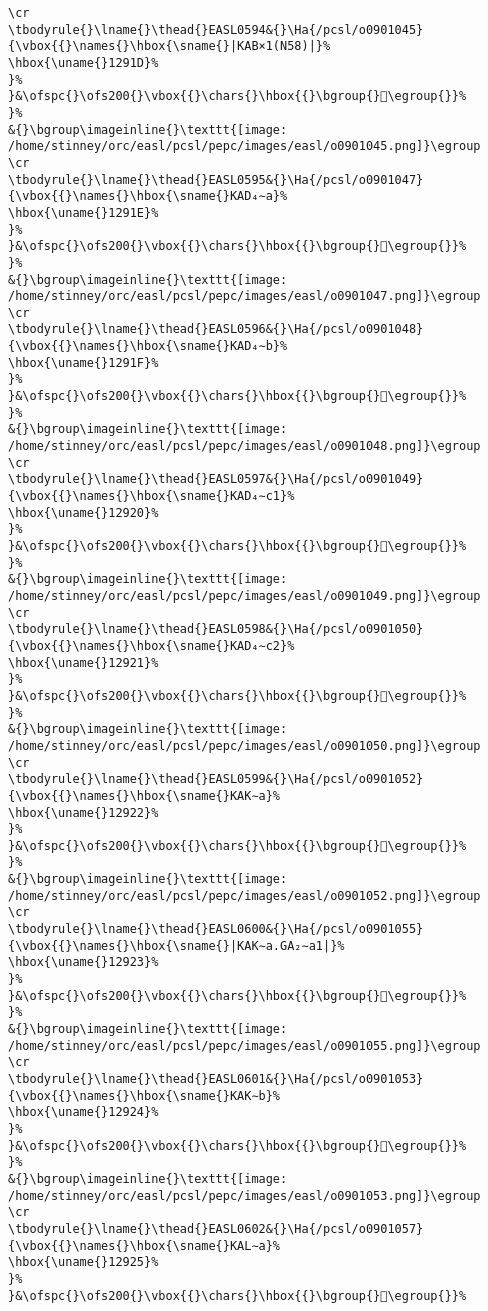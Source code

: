 \begin{verbatim}
\cr
\tbodyrule{}\lname{}\thead{}EASL0594&{}\Ha{/pcsl/o0901045}{\vbox{{}\names{}\hbox{\sname{}|KAB×1(N58)|}%
\hbox{\uname{}1291D}%
}%
}&\ofspc{}\ofs200{}\vbox{{}\chars{}\hbox{{}\bgroup{}𒤝\egroup{}}%
}%
&{}\bgroup\imageinline{}\texttt{[image: /home/stinney/orc/easl/pcsl/pepc/images/easl/o0901045.png]}\egroup
\cr
\tbodyrule{}\lname{}\thead{}EASL0595&{}\Ha{/pcsl/o0901047}{\vbox{{}\names{}\hbox{\sname{}KAD₄∼a}%
\hbox{\uname{}1291E}%
}%
}&\ofspc{}\ofs200{}\vbox{{}\chars{}\hbox{{}\bgroup{}𒤞\egroup{}}%
}%
&{}\bgroup\imageinline{}\texttt{[image: /home/stinney/orc/easl/pcsl/pepc/images/easl/o0901047.png]}\egroup
\cr
\tbodyrule{}\lname{}\thead{}EASL0596&{}\Ha{/pcsl/o0901048}{\vbox{{}\names{}\hbox{\sname{}KAD₄∼b}%
\hbox{\uname{}1291F}%
}%
}&\ofspc{}\ofs200{}\vbox{{}\chars{}\hbox{{}\bgroup{}𒤟\egroup{}}%
}%
&{}\bgroup\imageinline{}\texttt{[image: /home/stinney/orc/easl/pcsl/pepc/images/easl/o0901048.png]}\egroup
\cr
\tbodyrule{}\lname{}\thead{}EASL0597&{}\Ha{/pcsl/o0901049}{\vbox{{}\names{}\hbox{\sname{}KAD₄∼c1}%
\hbox{\uname{}12920}%
}%
}&\ofspc{}\ofs200{}\vbox{{}\chars{}\hbox{{}\bgroup{}𒤠\egroup{}}%
}%
&{}\bgroup\imageinline{}\texttt{[image: /home/stinney/orc/easl/pcsl/pepc/images/easl/o0901049.png]}\egroup
\cr
\tbodyrule{}\lname{}\thead{}EASL0598&{}\Ha{/pcsl/o0901050}{\vbox{{}\names{}\hbox{\sname{}KAD₄∼c2}%
\hbox{\uname{}12921}%
}%
}&\ofspc{}\ofs200{}\vbox{{}\chars{}\hbox{{}\bgroup{}𒤡\egroup{}}%
}%
&{}\bgroup\imageinline{}\texttt{[image: /home/stinney/orc/easl/pcsl/pepc/images/easl/o0901050.png]}\egroup
\cr
\tbodyrule{}\lname{}\thead{}EASL0599&{}\Ha{/pcsl/o0901052}{\vbox{{}\names{}\hbox{\sname{}KAK∼a}%
\hbox{\uname{}12922}%
}%
}&\ofspc{}\ofs200{}\vbox{{}\chars{}\hbox{{}\bgroup{}𒤢\egroup{}}%
}%
&{}\bgroup\imageinline{}\texttt{[image: /home/stinney/orc/easl/pcsl/pepc/images/easl/o0901052.png]}\egroup
\cr
\tbodyrule{}\lname{}\thead{}EASL0600&{}\Ha{/pcsl/o0901055}{\vbox{{}\names{}\hbox{\sname{}|KAK∼a.GA₂∼a1|}%
\hbox{\uname{}12923}%
}%
}&\ofspc{}\ofs200{}\vbox{{}\chars{}\hbox{{}\bgroup{}𒤣\egroup{}}%
}%
&{}\bgroup\imageinline{}\texttt{[image: /home/stinney/orc/easl/pcsl/pepc/images/easl/o0901055.png]}\egroup
\cr
\tbodyrule{}\lname{}\thead{}EASL0601&{}\Ha{/pcsl/o0901053}{\vbox{{}\names{}\hbox{\sname{}KAK∼b}%
\hbox{\uname{}12924}%
}%
}&\ofspc{}\ofs200{}\vbox{{}\chars{}\hbox{{}\bgroup{}𒤤\egroup{}}%
}%
&{}\bgroup\imageinline{}\texttt{[image: /home/stinney/orc/easl/pcsl/pepc/images/easl/o0901053.png]}\egroup
\cr
\tbodyrule{}\lname{}\thead{}EASL0602&{}\Ha{/pcsl/o0901057}{\vbox{{}\names{}\hbox{\sname{}KAL∼a}%
\hbox{\uname{}12925}%
}%
}&\ofspc{}\ofs200{}\vbox{{}\chars{}\hbox{{}\bgroup{}𒤥\egroup{}}%

\end{verbatim}
